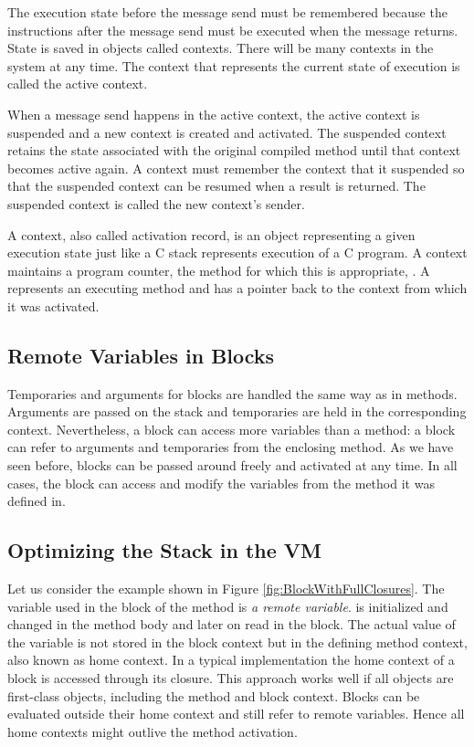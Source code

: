 \documentclass[a4paper,10pt,twoside]{book}
\begin{document}
The execution state before the message send must be remembered because
the instructions after the message send must be executed when the
message returns. State is saved in objects called contexts. There will
be many contexts in the system at any time. The context that
represents the current state of execution is called the active
context.

When a message send happens in the active context, the active context
is suspended and a new context is created and activated. The
suspended context retains the state associated with the original
compiled method until that context becomes active again. A context
must remember the context that it suspended so that the suspended
context can be resumed when a result is returned. The suspended
context is called the new context's sender.

A context, also called activation record, is an object representing a
given execution state just like a C stack represents execution of a C
program. A context maintains a program counter, the method for which
this is appropriate, \etc. A  represents an executing
method and has a pointer back to the context from which it was activated.


\subsection{Remote Variables in Blocks}

Temporaries and arguments for blocks are handled the same way as in methods.
Arguments are passed on the stack and temporaries are held in the corresponding context.
Nevertheless, a block can access more variables than a method:
a block can refer to arguments and temporaries from the enclosing method.
As we have seen before, blocks can be passed around freely and activated at any time.
In all cases, the block can access and modify the variables from the method it was defined in.


\subsection{Optimizing the Stack in the VM}

Let us consider the example shown in Figure \ref{fig:BlockWithFullClosures}.
The  variable used in the block of the  method is \emph{a remote variable}.
 is initialized and changed in the method body and later on read in the block.
The actual value of the variable is not stored in the block context but in the defining method context, also known as home context.
In a typical implementation the home context of a block is accessed through its closure.
This approach works well if all objects are first-class objects, including the method and block context.
Blocks can be evaluated outside their home context and still refer to remote variables.
Hence all home contexts might outlive the method activation.
\end{document}
